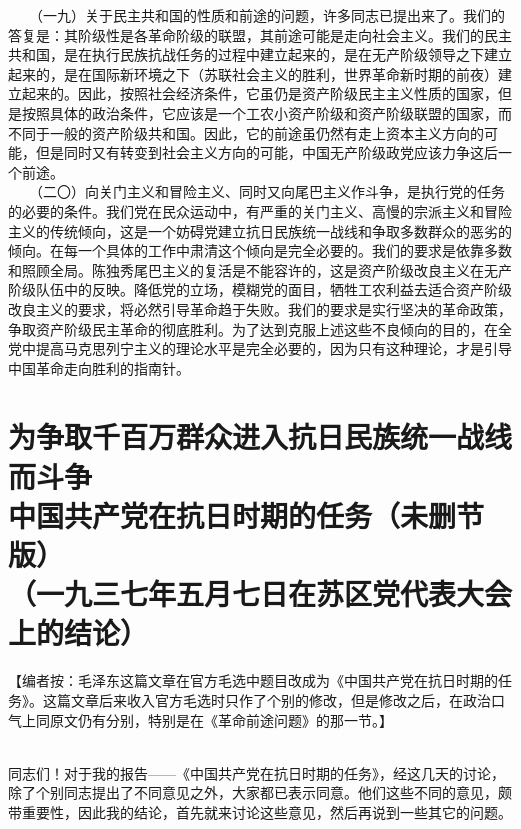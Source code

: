 \documentclass[cn,11pt,chinese]{elegantbook}
\def\myformat#1{\hfil\hfil #1}
\begin{document}
　　（一九）关于民主共和国的性质和前途的问题，许多同志已提出来了。我们的答复是：其阶级性是各革命阶级的联盟，其前途可能是走向社会主义。我们的民主共和国，是在执行民族抗战任务的过程中建立起来的，是在无产阶级领导之下建立起来的，是在国际新环境之下（苏联社会主义的胜利，世界革命新时期的前夜）建立起来的。因此，按照社会经济条件，它虽仍是资产阶级民主主义性质的国家，但是按照具体的政治条件，它应该是一个工农小资产阶级和资产阶级联盟的国家，而不同于一般的资产阶级共和国。因此，它的前途虽仍然有走上资本主义方向的可能，但是同时又有转变到社会主义方向的可能，中国无产阶级政党应该力争这后一个前途。\\
　　（二〇）向关门主义和冒险主义、同时又向尾巴主义作斗争，是执行党的任务的必要的条件。我们党在民众运动中，有严重的关门主义、高慢的宗派主义和冒险主义的传统倾向，这是一个妨碍党建立抗日民族统一战线和争取多数群众的恶劣的倾向。在每一个具体的工作中肃清这个倾向是完全必要的。我们的要求是依靠多数和照顾全局。陈独秀尾巴主义的复活是不能容许的，这是资产阶级改良主义在无产阶级队伍中的反映。降低党的立场，模糊党的面目，牺牲工农利益去适合资产阶级改良主义的要求，将必然引导革命趋于失败。我们的要求是实行坚决的革命政策，争取资产阶级民主革命的彻底胜利。为了达到克服上述这些不良倾向的目的，在全党中提高马克思列宁主义的理论水平是完全必要的，因为只有这种理论，才是引导中国革命走向胜利的指南针。\\
\newpage
\section*{\myformat{为争取千百万群众进入抗日民族统一战线而斗争}\\\myformat{中国共产党在抗日时期的任务（未删节版）}\\\myformat{（一九三七年五月七日在苏区党代表大会上的结论）}}
\begin{introduction}\item
【编者按：毛泽东这篇文章在官方毛选中题目改成为《中国共产党在抗日时期的任务》。这篇文章后来收入官方毛选时只作了个别的修改，但是修改之后，在政治口气上同原文仍有分别，特别是在《革命前途问题》的那一节。】
\end{introduction}
\\
同志们！对于我的报告——《中国共产党在抗日时期的任务》，经这几天的讨论，除了个别同志提出了不同意见之外，大家都已表示同意。他们这些不同的意见，颇带重要性，因此我的结论，首先就来讨论这些意见，然后再说到一些其它的问题。\\
\end{document}
